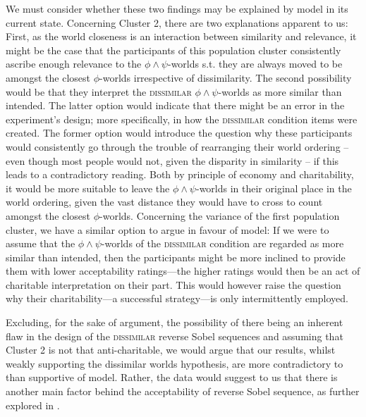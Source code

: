 We must consider whether these two findings may be explained by  model in its current state. Concerning Cluster 2, there are two explanations apparent to us: First, as the world closeness is an interaction between similarity and relevance, it might be the case that the participants of this population cluster consistently ascribe enough relevance to the $\phi\land\psi$-worlds s.t. they are always moved to be amongst the closest $\phi$-worlds irrespective of dissimilarity. The second possibility would be that they interpret the {\scshape dissimilar} $\phi\land\psi$-worlds as more similar than intended. The latter option would indicate that there might be an error in the experiment's design; more specifically, in how the {\scshape dissimilar} condition items were created. The former option would introduce the question why these participants would consistently go through the trouble of rearranging their world ordering -- even though most people would not, given the disparity in similarity -- if this leads to a contradictory reading. Both by principle of economy and charitability, it would be more suitable to leave the $\phi\land\psi$-worlds in their original place in the world ordering, given the vast distance they would have to cross to count amongst the closest $\phi$-worlds. Concerning the variance of the first population cluster, we have a similar option to argue in favour of  model: If we were to assume that the $\phi\land\psi$-worlds of the {\scshape dissimilar} condition are regarded as more similar than intended, then the participants might be more inclined to provide them with lower acceptability ratings---the higher ratings would then be an act of charitable interpretation on their part. This would however raise the question why their charitability---a successful strategy---is only intermittently employed.

Excluding, for the sake of argument, the possibility of there being an inherent flaw in the design of the {\scshape dissimilar} reverse Sobel sequences and assuming that Cluster 2 is not that anti-charitable, we would argue that our results, whilst weakly supporting the dissimilar worlds hypothesis, are more contradictory to than supportive of  model. Rather, the data would suggest to us that there is another main factor behind the acceptability of reverse Sobel sequence, as further explored in .

